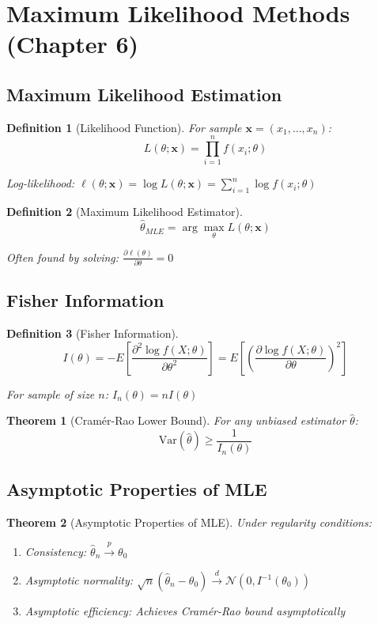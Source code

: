 \documentclass[12pt,a4paper]{amsart}
\newtheorem{theorem}{Theorem}[section]
\newtheorem{definition}{Definition}[section]
\theoremstyle{remark}
\begin{document}
\section{Maximum Likelihood Methods (Chapter 6)}

\subsection{Maximum Likelihood Estimation}

\begin{definition}[Likelihood Function]
For sample $\mathbf{x} = (x_1, \ldots, x_n)$:
$$L(\theta; \mathbf{x}) = \prod_{i=1}^n f(x_i; \theta)$$

Log-likelihood: $\ell(\theta; \mathbf{x}) = \log L(\theta; \mathbf{x}) = \sum_{i=1}^n \log f(x_i; \theta)$
\end{definition}

\begin{definition}[Maximum Likelihood Estimator]
$$\hat{\theta}_{MLE} = \arg\max_\theta L(\theta; \mathbf{x})$$

Often found by solving: $\frac{\partial \ell(\theta)}{\partial \theta} = 0$
\end{definition}

\subsection{Fisher Information}

\begin{definition}[Fisher Information]
$$I(\theta) = -E\left[\frac{\partial^2 \log f(X; \theta)}{\partial \theta^2}\right] = E\left[\left(\frac{\partial \log f(X; \theta)}{\partial \theta}\right)^2\right]$$

For sample of size $n$: $I_n(\theta) = nI(\theta)$
\end{definition}

\begin{theorem}[Cramér-Rao Lower Bound]
For any unbiased estimator $\hat{\theta}$:
$$\text{Var}(\hat{\theta}) \geq \frac{1}{I_n(\theta)}$$
\end{theorem}

\subsection{Asymptotic Properties of MLE}

\begin{theorem}[Asymptotic Properties of MLE]
Under regularity conditions:
\begin{enumerate}
\item Consistency: $\hat{\theta}_n \stackrel{p}{\to} \theta_0$
\item Asymptotic normality: $\sqrt{n}(\hat{\theta}_n - \theta_0) \stackrel{d}{\to} \mathcal{N}(0, I^{-1}(\theta_0))$
\item Asymptotic efficiency: Achieves Cramér-Rao bound asymptotically
\end{enumerate}
\end{theorem}
\end{document}
